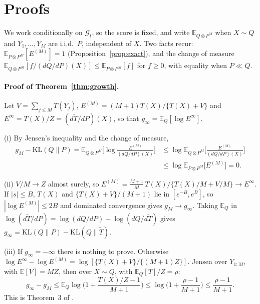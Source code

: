 \documentclass[11pt]{article}
\newcommand{\E}{\mathbb{E}}
\newcommand{\KL}{\mathrm{KL}}
\newcommand{\G}{\mathcal{G}}
\theoremstyle{remark}
\begin{document}
\section{Proofs}\label{app:proofs}

We work conditionally on $\G_t$, so the score is fixed, and write
$\E_{Q\otimes P^M}$ when $X \sim Q$ and $Y_1, \ldots, Y_M$ are i.i.d.\ $P$,
independent of $X$. Two facts recur: $\E_{P\otimes P^M}[E^{(M)}] = 1$
(Proposition~\ref{prop:exact}), and the change of measure
$\E_{Q\otimes P^M}[f/(dQ/dP)(X)] \le \E_{P\otimes P^M}[f]$ for $f \ge 0$, with
equality when $P \ll Q$.

\paragraph{Proof of Theorem~\ref{thm:growth}.}
Let $V = \sum_{j \le M} T(Y_j)$, $E^{(M)} = (M+1)T(X)/\{T(X)+V\}$ and
$E^\infty = T(X)/Z = (d\tilde T/dP)(X)$, so that $g_\infty = \E_Q[\log E^\infty]$.

(i) By Jensen's inequality and the change of measure,
\[
\begin{aligned}
g_M - \KL(Q\|P) = \E_{Q \otimes P^M}\Big[\log\frac{E^{(M)}}{(dQ/dP)(X)}\Big]
&\le \log \E_{Q \otimes P^M}\Big[\frac{E^{(M)}}{(dQ/dP)(X)}\Big] \\
&\le \log \E_{P \otimes P^M}\big[E^{(M)}\big] = 0 .
\end{aligned}
\]

(ii) $V/M \to Z$ almost surely, so
$E^{(M)} = \frac{M+1}{M}\,T(X)/\{T(X)/M + V/M\} \to E^\infty$. If $|s| \le B$,
$T(X)$ and $\{T(X)+V\}/(M+1)$ lie in $[e^{-B}, e^{B}]$, so
$|\log E^{(M)}| \le 2B$ and dominated convergence gives $g_M \to g_\infty$.
Taking $\E_Q$ in $\log(d\tilde T/dP) = \log(dQ/dP) - \log(dQ/d\tilde T)$ gives
$g_\infty = \KL(Q\|P) - \KL(Q\|\tilde T)$.

(iii) If $g_\infty = -\infty$ there is nothing to prove. Otherwise
$\log E^\infty - \log E^{(M)} = \log[\{T(X) + V\}/\{(M+1)Z\}]$. Jensen over
$Y_{1:M}$, with $\E[V] = MZ$, then over $X \sim Q$, with $\E_Q[T]/Z = \rho$:
\[
g_\infty - g_M \le \E_Q\log\Big(1 + \frac{T(X)/Z - 1}{M+1}\Big)
\le \log\Big(1 + \frac{\rho - 1}{M+1}\Big) \le \frac{\rho-1}{M+1}.
\]
This is Theorem~3 of \citet{dombowsky2026besag}.
\end{document}
